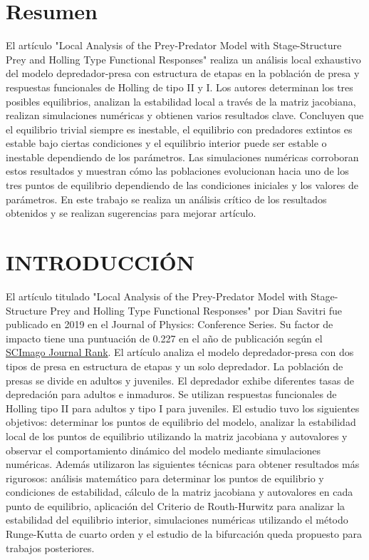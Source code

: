 \documentclass{wscpaperproc}
\theoremstyle{wsc}
\begin{document}
\section*{Resumen}
El artículo "Local Analysis of the Prey-Predator Model with Stage-Structure Prey and Holling
Type Functional Responses" realiza un análisis local exhaustivo del modelo depredador-presa con estructura de
etapas en la población de presa y respuestas funcionales de Holling de tipo II y I. Los autores determinan los tres 
posibles equilibrios, analizan la estabilidad local a través de la matriz jacobiana, realizan simulaciones numéricas y 
obtienen varios resultados clave. Concluyen que el equilibrio trivial siempre es inestable, el equilibrio con predadores 
extintos es estable bajo ciertas condiciones y el equilibrio interior puede ser estable o inestable dependiendo de los parámetros. 
Las simulaciones numéricas corroboran estos resultados
y muestran cómo las poblaciones evolucionan hacia uno de los tres puntos de equilibrio dependiendo de las
condiciones iniciales y los valores de parámetros. En este trabajo se realiza un análisis crítico de 
los resultados obtenidos y se realizan sugerencias para mejorar artículo.


\section{INTRODUCCI\'ON}
\label{sec:intro}
El artículo titulado "Local Analysis of the Prey-Predator Model with Stage-Structure Prey and Holling
Type Functional Responses" por Dian Savitri fue publicado en 2019
en el Journal of Physics: Conference Series. Su factor de impacto tiene una puntuaci\'on de 0.227 en el año de
publicación según el \href{https://www.scimagojr.com/}{SCImago Journal Rank}. El artículo analiza el modelo depredador-presa con dos tipos de presa en estructura
de etapas y un solo depredador. La población de presas se divide en adultos y juveniles. El depredador
exhibe diferentes tasas de depredación para adultos e inmaduros. Se utilizan respuestas funcionales de
Holling \cite{holling_functional_1965} tipo II  para adultos y tipo I para juveniles. El estudio tuvo los siguientes objetivos:
determinar los puntos de equilibrio del modelo, analizar la estabilidad local de los puntos de equilibrio
utilizando la matriz jacobiana y autovalores y observar el comportamiento dinámico del modelo mediante
simulaciones numéricas. Además utilizaron las siguientes técnicas para obtener resultados
más rigurosos: análisis matemático para determinar los puntos de equilibrio y condiciones de estabilidad,
cálculo de la matriz jacobiana y autovalores en cada punto de equilibrio, aplicación del Criterio de Routh-Hurwitz
para analizar la estabilidad del equilibrio interior, simulaciones numéricas utilizando el método Runge-Kutta de
cuarto orden y el estudio de la bifurcación queda propuesto para trabajos posteriores. 
\end{document}
